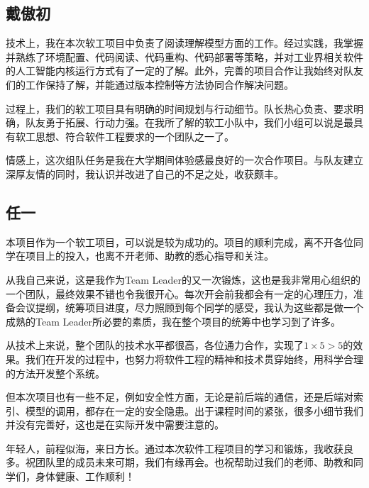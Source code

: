 \documentclass[12pt]{article}
\begin{document}
\subsection{戴傲初}
技术上，我在本次软工项目中负责了阅读理解模型方面的工作。经过实践，我掌握并熟练了环境配置、代码阅读、代码重构、代码部署等策略，并对工业界相关软件的人工智能内核运行方式有了一定的了解。此外，完善的项目合作让我始终对队友们的工作保持了解，并能通过版本控制等方法协同合作解决问题。

过程上，我们的软工项目具有明确的时间规划与行动细节。队长热心负责、要求明确，队友勇于拓展、行动力强。在我所了解的软工小队中，我们小组可以说是最具有软工思想、符合软件工程要求的一个团队之一了。

情感上，这次组队任务是我在大学期间体验感最良好的一次合作项目。与队友建立深厚友情的同时，我认识并改进了自己的不足之处，收获颇丰。

\subsection{任一}
本项目作为一个软工项目，可以说是较为成功的。项目的顺利完成，离不开各位同学在项目上的投入，也离不开老师、助教的悉心指导和关注。

从我自己来说，这是我作为Team Leader的又一次锻炼，这也是我非常用心组织的一个团队，最终效果不错也令我很开心。每次开会前我都会有一定的心理压力，准备会议提纲，统筹项目进度，尽力照顾到每个同学的感受，我认为这些都是做一个成熟的Team Leader所必要的素质，我在整个项目的统筹中也学习到了许多。

从技术上来说，整个团队的技术水平都很高，各位通力合作，实现了$1 \times 5 > 5$的效果。我们在开发的过程中，也努力将软件工程的精神和技术贯穿始终，用科学合理的方法开发整个系统。

但本次项目也有一些不足，例如安全性方面，无论是前后端的通信，还是后端对索引、模型的调用，都存在一定的安全隐患。出于课程时间的紧张，很多小细节我们并没有完善好，这也是在实际开发中需要注意的。

年轻人，前程似海，来日方长。通过本次软件工程项目的学习和锻炼，我收获良多。祝团队里的成员未来可期，我们有缘再会。也祝帮助过我们的老师、助教和同学们，身体健康、工作顺利！

\end{document}
